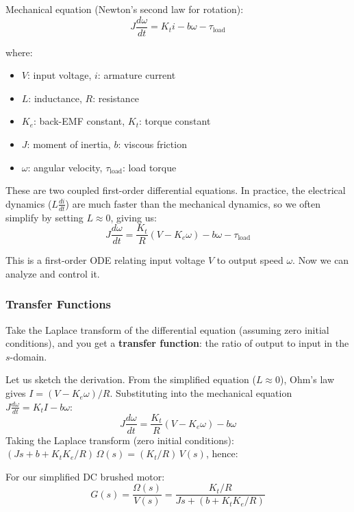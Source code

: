 Mechanical equation (Newton's second law for rotation):
\begin{equation}
J \frac{d\omega}{dt} = K_t i - b\omega - \tau_{\text{load}}
\end{equation}

where:
\begin{itemize}[nosep]
    \item $V$: input voltage, $i$: armature current
    \item $L$: inductance, $R$: resistance
    \item $K_e$: back-EMF constant, $K_t$: torque constant
    \item $J$: moment of inertia, $b$: viscous friction
    \item $\omega$: angular velocity, $\tau_{\text{load}}$: load torque
\end{itemize}

These are two coupled first-order differential equations. In practice, the electrical dynamics ($L \frac{di}{dt}$) are much faster than the mechanical dynamics, so we often simplify by setting $L \approx 0$, giving us:
\begin{equation}
J \frac{d\omega}{dt} = \frac{K_t}{R}(V - K_e \omega) - b\omega - \tau_{\text{load}}
\end{equation}

This is a first-order ODE relating input voltage $V$ to output speed $\omega$. Now we can analyze and control it.

\subsubsection{Transfer Functions}

Take the Laplace transform of the differential equation (assuming zero initial conditions), and you get a \textbf{transfer function}: the ratio of output to input in the $s$-domain.

Let us sketch the derivation. From the simplified equation ($L \approx 0$), Ohm's law gives $I = (V - K_e \omega)/R$. Substituting into the mechanical equation $J\frac{d\omega}{dt} = K_t I - b\omega$:
\[
J\frac{d\omega}{dt} = \frac{K_t}{R}(V - K_e \omega) - b\omega
\]
Taking the Laplace transform (zero initial conditions): $(Js + b + K_t K_e / R)\,\Omega(s) = (K_t / R)\,V(s)$, hence:

For our simplified DC brushed motor:
\begin{equation}
G(s) = \frac{\Omega(s)}{V(s)} = \frac{K_t / R}{Js + (b + K_t K_e / R)}
\end{equation}

